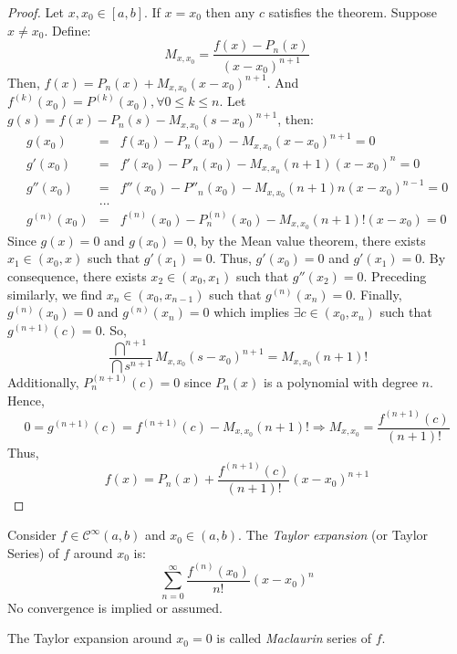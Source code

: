 \begin{proof}
    Let $x, x_0 \in [a,b]$. If $x = x_0$ then any $c$ satisfies the theorem. Suppose $x \neq x_0$. Define:
    \begin{equation*}
        M_{x, x_0} = \frac{f(x) - P_n(x)}{(x-x_0)^{n+1}}
    \end{equation*}
    Then, $f(x) = P_n(x) + M_{x, x_0}(x-x_0)^{n+1}$. And $f^{(k)}(x_0) = P^{(k)}(x_0), \forall 0 \leq k \leq n$. Let $g(s) = f(x) - P_n(s) - M_{x, x_0}(s-x_0)^{n+1}$, then:
    \begin{eqnarray*}
        g(x_0) &=& f(x_0) - P_n(x_0) - M_{x,x_0}(x-x_0)^{n+1} = 0 \\
        g'(x_0) &=& f'(x_0) - P'_n(x_0) - M_{x,x_0}(n+1)(x-x_0)^{n} = 0 \\
        g''(x_0) &=& f''(x_0) - P''_n(x_0) - M_{x,x_0}(n+1)n(x-x_0)^{n-1} = 0 \\
        &...& \\
        g^{(n)}(x_0) &=& f^{(n)}(x_0) - P^{(n)}_n(x_0) - M_{x,x_0}(n+1)!(x-x_0) = 0
    \end{eqnarray*}
    Since $g(x) = 0$ and $g(x_0) = 0$, by the Mean value theorem, there exists $x_1 \in (x_0, x)$ such that $g'(x_1) = 0$. Thus, $g'(x_0) = 0$ and $g'(x_1) = 0$. By consequence, there exists $x_2 \in (x_0, x_1)$ such that $g''(x_2) = 0$. Preceding similarly, we find $x_n \in (x_0, x_{n-1})$ such that $g^{(n)}(x_n) = 0$. Finally, $g^{(n)}(x_0) = 0$ and $g^{(n)}(x_n) = 0$ which implies $\exists c \in (x_0, x_n)$ such that $g^{(n+1)}(c) = 0$. So,
    \begin{equation*}
        \frac{\dint ^{n+1}}{\dint s^{n+1}} M_{x, x_0}(s - x_0)^{n+1} = M_{x, x_0}(n+1)!
    \end{equation*}
    Additionally, $P_n^{(n+1)}(c) = 0$ since $P_n(x)$ is a polynomial with degree $n$. Hence,
    \begin{equation*}
        0 = g^{(n+1)}(c) = f^{(n+1)}(c) - M_{x, x_0}(n+1)! \Longrightarrow M_{x, x_0} = \frac{f^{(n+1)}(c)}{(n+1)!}
    \end{equation*}
    Thus,
    \begin{equation*}
        f(x) = P_n(x) + \frac{f^{(n+1)}(c)}{(n+1)!}(x-x_0)^{n+1}
    \end{equation*}
\end{proof}

\begin{definition}
    Consider $f \in \mathcal{C}^\infty(a,b)$ and $x_0 \in (a,b)$. The \emph{Taylor expansion} (or Taylor Series) of $f$ around $x_0$ is:
    \begin{equation*}
        \sum \limits_{n=0}^\infty \frac{f^{(n)}(x_0)}{n!}(x - x_0)^n
    \end{equation*}
    No convergence is implied or assumed.
\end{definition}

\begin{remark}
    The Taylor expansion around $x_0 = 0$ is called \emph{Maclaurin} series of $f$.
\end{remark}